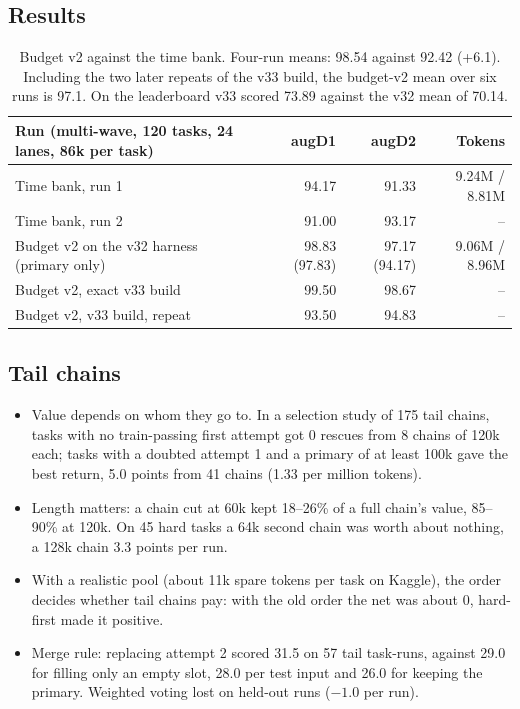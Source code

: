 \subsection{Results}
\begin{table}[H]\centering\small
\begin{tabular}{@{}lrrr@{}}
\toprule
Run (multi-wave, 120 tasks, 24 lanes, 86k per task) & augD1 & augD2 & Tokens \\
\midrule
Time bank, run 1 & 94.17 & 91.33 & 9.24M / 8.81M \\
Time bank, run 2 & 91.00 & 93.17 & -- \\
Budget v2 on the v32 harness (primary only) & 98.83 (97.83) & 97.17 (94.17) & 9.06M / 8.96M \\
Budget v2, exact v33 build & 99.50 & 98.67 & -- \\
Budget v2, v33 build, repeat & 93.50 & 94.83 & -- \\
\bottomrule
\end{tabular}
\caption{Budget v2 against the time bank. Four-run means: 98.54 against 92.42 (+6.1). Including the two later repeats of the v33 build, the budget-v2 mean over six runs is 97.1. On the leaderboard v33 scored 73.89 against the v32 mean of 70.14.}
\end{table}

\subsection{Tail chains}
\begin{itemize}
\item Value depends on whom they go to. In a selection study of 175 tail chains, tasks with no train-passing first attempt got 0 rescues from 8 chains of 120k each; tasks with a doubted attempt 1 and a primary of at least 100k gave the best return, 5.0 points from 41 chains (1.33 per million tokens).
\item Length matters: a chain cut at 60k kept 18--26\% of a full chain's value, 85--90\% at 120k. On 45 hard tasks a 64k second chain was worth about nothing, a 128k chain 3.3 points per run.
\item With a realistic pool (about 11k spare tokens per task on Kaggle), the order decides whether tail chains pay: with the old order the net was about 0, hard-first made it positive.
\item Merge rule: replacing attempt 2 scored 31.5 on 57 tail task-runs, against 29.0 for filling only an empty slot, 28.0 per test input and 26.0 for keeping the primary. Weighted voting lost on held-out runs ($-1.0$ per run).
\end{itemize}

